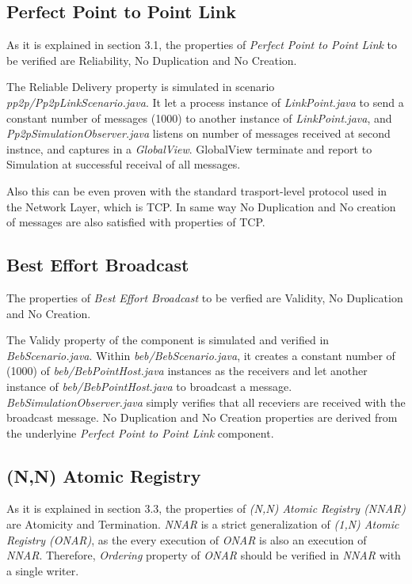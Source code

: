 \documentclass[a4paper, 11pt]{article}
\begin{document}
\subsection{Perfect Point to Point Link}

As it is explained in section 3.1, the properties of \textit{Perfect Point to Point Link} to be verified are Reliability, No Duplication and No Creation.

The Reliable Delivery property is simulated in scenario \textit{pp2p/Pp2pLinkScenario.java}. It let a process instance of \textit{LinkPoint.java} to send a constant number of messages (1000) to another instance of \textit{LinkPoint.java}, and \textit{Pp2pSimulationObserver.java} listens on number of messages received at second instnce, and captures in a 
\textit{GlobalView}. GlobalView terminate and report to Simulation at successful receival of all messages.

Also this can be even proven with the standard trasport-level protocol used in the Network Layer, which is TCP. In same way No Duplication and No creation of messages are also satisfied with properties of TCP.

\subsection{Best Effort Broadcast}

The properties of \textit{Best Effort Broadcast} to be verfied are Validity, No Duplication and No Creation.

The Validy property of the component is simulated and verified in \textit{BebScenario.java}. Within \textit{beb/BebScenario.java}, it creates a constant number of (1000) of \textit{beb/BebPointHost.java} instances as the receivers and let another instance of \textit{beb/BebPointHost.java} to broadcast a message. \textit{BebSimulationObserver.java} simply verifies that all receviers are received with the broadcast message. No Duplication and No Creation properties are derived from the underlyine \textit{Perfect Point to Point Link} component.

\subsection{(N,N) Atomic Registry}

As it is explained in section 3.3, the properties of \textit{(N,N) Atomic Registry (NNAR)} are Atomicity and Termination. \textit{NNAR} is a strict generalization of \textit{(1,N) Atomic Registry (ONAR)}, as the every execution of \textit{ONAR} is also an execution of \textit{NNAR}. Therefore, \textit{Ordering} property of \textit{ONAR} should be verified in \textit{NNAR} with a single writer.
\end{document}
